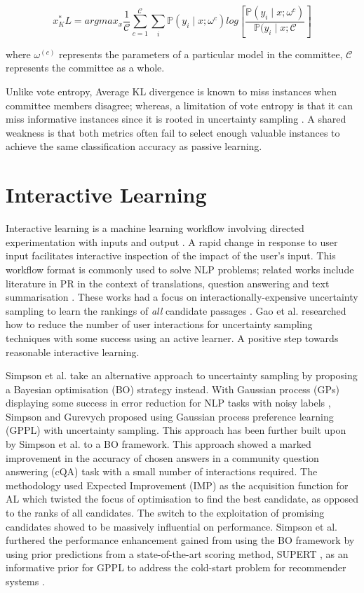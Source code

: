$$
	x^\ast_KL = argmax_x \frac{1}{\mathcal{C}} \sum_{c=1}^{\mathcal{C}} \sum_i \mathbb{P}(y_i \mid x; \omega^{c}) log \left[\frac{\mathbb{P}(y_i \mid x; \omega^{c})}{\mathbb{P}(y_i \mid x; \mathcal{C}}\right]
$$

\noindent
where $\omega^{(c)}$ represents the parameters of a particular model in the committee, $\mathcal{C}$ represents the committee as a whole.

\medbreak
Unlike vote entropy, Average KL divergence is known to miss instances when committee members disagree; whereas, a limitation of vote entropy is that it can miss informative instances since it is rooted in uncertainty sampling \cite{Li06}. A shared weakness is that both metrics often fail to select enough valuable instances to achieve the same classification accuracy as passive learning.
		
\section{Interactive Learning}
\label{chap:literaturereview:interactive}

Interactive learning is a machine learning workflow involving directed experimentation with inputs and output \cite{Amershi14}. A rapid change in response to user input facilitates interactive inspection of the impact of the user’s input.  This workflow format is commonly used to solve NLP problems; related works include literature in PR in the context of translations, question answering and text summarisation \cite{Peris18, Lin17, PVS17}. These works had a focus on interactionally-expensive uncertainty sampling to learn the rankings of \emph{all} candidate passages \cite{Simpson19}. Gao et al. \cite{Gao18} researched how to reduce the number of user interactions for uncertainty sampling techniques with some success using an active learner. A positive step towards reasonable interactive learning.

\medbreak
Simpson et al. \cite{Simpson19} take an alternative approach to uncertainty sampling by proposing a Bayesian optimisation (BO) strategy instead. With Gaussian process (GPs) displaying some success in error reduction for NLP tasks with noisy labels \cite{Cohn13, Beck14}, Simpson and Gurevych \cite{Simpson18} proposed using Gaussian process preference learning (GPPL) with uncertainty sampling. This approach has been further built upon by Simpson et al. \cite{Simpson19} to a BO framework. This approach showed a marked improvement in the accuracy of chosen answers in a community question answering (cQA) task with a small number of interactions required. The methodology used Expected Improvement (IMP) as the acquisition function for AL which twisted the focus of optimisation to find the best candidate, as opposed to the ranks of all candidates. The switch to the exploitation of promising candidates showed to be massively influential on performance. Simpson et al. \cite{Simpson19} furthered the performance enhancement gained from using the BO framework by using prior predictions from a state-of-the-art scoring method, SUPERT \cite{Gao20}, as an informative prior for GPPL to address the cold-start problem for recommender systems \cite{Bobadilla12}.
		

